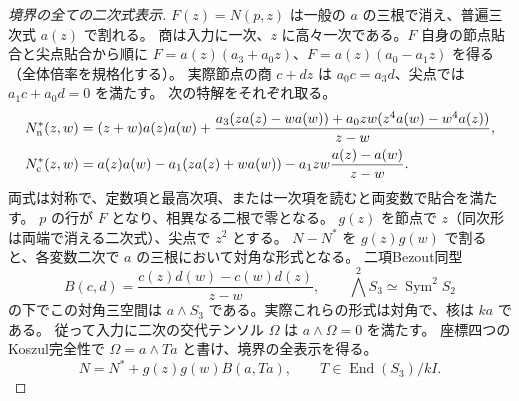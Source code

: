 \begin{proof}[境界の全ての二次式表示]
$F(z)=N(p,z)$ は一般の $a$ の三根で消え、普遍三次式 $a(z)$ で割れる。
商は入力に一次、$z$ に高々一次である。$F$ 自身の節点貼合と尖点貼合から順に
$F=a(z)(a_3+a_0 z)$、$F=a(z)(a_0-a_1z)$ を得る（全体倍率を規格化する）。
実際節点の商 $c+dz$ は $a_0c=a_3d$、尖点では $a_1c+a_0d=0$ を満たす。
次の特解をそれぞれ取る。
\begin{align*}
 N_{\rm n}^*(z,w)&=(z+w)a(z)a(w)
 +\frac{a_3(za(z)-wa(w))+a_0zw(z^4a(w)-w^4a(z))}{z-w},\\
 N_{\rm c}^*(z,w)&=a(z)a(w)-a_1(za(z)+wa(w))-a_1zw\frac{a(z)-a(w)}{z-w}.
\end{align*}
両式は対称で、定数項と最高次項、または一次項を読むと両変数で貼合を満たす。
$p$ の行が $F$ となり、相異なる二根で零となる。
$g(z)$ を節点で $z$（同次形は両端で消える二次式）、尖点で $z^2$ とする。
$N-N^*$ を $g(z)g(w)$ で割ると、各変数二次で $a$ の三根において対角な形式となる。
二項Bezout同型
\[
 B(c,d)=\frac{c(z)d(w)-c(w)d(z)}{z-w},\qquad
 \bigwedge^2 S_3\simeq\operatorname{Sym}^2 S_2
\]
の下でこの対角三空間は $a\wedge S_3$ である。実際これらの形式は対角で、核は $k a$ である。
従って入力に二次の交代テンソル $\Omega$ は $a\wedge\Omega=0$ を満たす。
座標四つのKoszul完全性で $\Omega=a\wedge Ta$ と書け、境界の全表示を得る。
\[
                  N=N^*+g(z)g(w)B(a,Ta),\qquad T\in\operatorname{End}(S_3)/kI .
\]
\end{proof}

